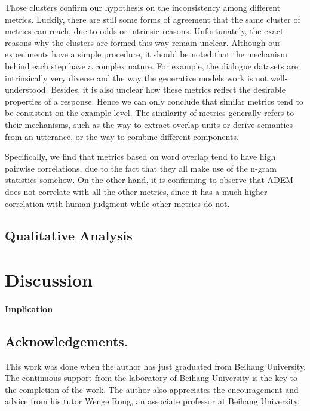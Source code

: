 \documentclass[runningheads]{llncs}
\begin{document}
    Those clusters confirm our hypothesis on the inconsistency among different metrics. Luckily, there are still some forms of agreement that the same cluster of metrics can reach, due to odds or intrinsic reasons. Unfortunately, the exact reasons why the clusters are formed this way remain unclear. Although our experiments have a simple procedure, it should be noted that the mechanism behind each step have a complex nature. For example, the dialogue datasets are intrinsically very diverse and the way the generative models work is not well-understood. Besides, it is also unclear how these metrics reflect the desirable properties of a response. Hence we can only conclude that similar metrics tend to be consistent on the example-level. The similarity of metrics generally refers to their mechanisms, such as the way to extract overlap units or derive semantics from an utterance, or the way to combine different components.

    Specifically, we find that metrics based on word overlap tend to have high pairwise correlations, due to the fact that they all make use of the n-gram statistics somehow. On the other hand, it is confirming to observe that ADEM does not correlate with all the other metrics, since it has a much higher correlation with human judgment while other metrics do not.

    \subsection{Qualitative Analysis}

    

    \section{Discussion}

    \paragraph{Implication}


    \subsection*{Acknowledgements.}
    This work was done when the author has just graduated from Beihang University. The continuous support from the laboratory of Beihang University is the key to the completion of the work. The author also appreciates the encouragement and advice from his tutor Wenge Rong, an associate professor at Beihang University.

    
    
\end{document}
